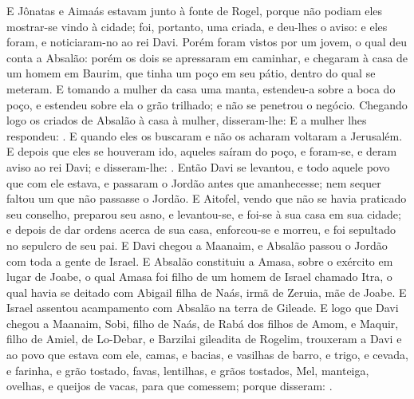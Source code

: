 {  E Jônatas e Aimaás estavam junto à fonte de Rogel, porque não podiam eles mostrar-se vindo à cidade; foi, portanto, uma criada, e deu-lhes o aviso: e eles foram, e noticiaram-no ao rei Davi.
  Porém foram vistos por um jovem, o qual deu conta a Absalão: porém os dois se apressaram em caminhar, e chegaram à casa de um homem em Baurim, que tinha um poço em seu pátio, dentro do qual se meteram.
  E tomando a mulher da casa uma manta, estendeu-a sobre a boca do poço, e estendeu sobre ela o grão trilhado; e não se penetrou o negócio.
  Chegando logo os criados de Absalão à casa à mulher, disseram-lhe:  E a mulher lhes respondeu: . E quando eles os buscaram e não os acharam voltaram a Jerusalém.
  E depois que eles se houveram ido, aqueles saíram do poço, e foram-se, e deram aviso ao rei Davi; e disseram-lhe: .
  Então Davi se levantou, e todo aquele povo que com ele estava, e passaram o Jordão antes que amanhecesse; nem sequer faltou um que não passasse o Jordão.
  E Aitofel, vendo que não se havia praticado seu conselho, preparou seu asno, e levantou-se, e foi-se à sua casa em sua cidade; e depois de dar ordens acerca de sua casa, enforcou-se e morreu, e foi sepultado no sepulcro de seu pai.
  E Davi chegou a Maanaim, e Absalão passou o Jordão com toda a gente de Israel.
  E Absalão constituiu a Amasa, sobre o exército em lugar de Joabe, o qual Amasa foi filho de um homem de Israel chamado Itra, o qual havia se deitado com Abigail filha de Naás, irmã de Zeruia, mãe de Joabe.
  E Israel assentou acampamento com Absalão na terra de Gileade.
  E logo que Davi chegou a Maanaim, Sobi, filho de Naás, de Rabá dos filhos de Amom, e Maquir, filho de Amiel, de Lo-Debar, e Barzilai gileadita de Rogelim,
  trouxeram a Davi e ao povo que estava com ele, camas, e bacias, e vasilhas de barro, e trigo, e cevada, e farinha, e grão tostado, favas, lentilhas, e grãos tostados,
  Mel, manteiga, ovelhas, e queijos de vacas, para que comessem; porque disseram: .
\par }

